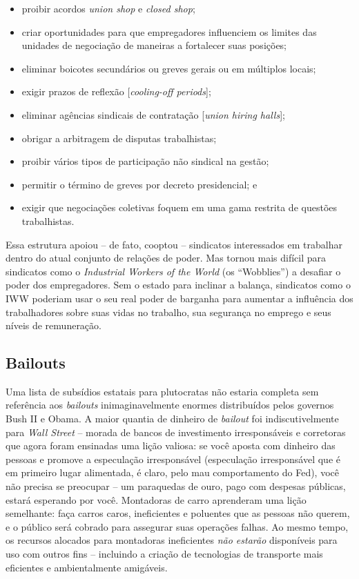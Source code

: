 \begin{itemize}
\item proibir acordos \emph{union shop} e \emph{closed shop};
\item criar oportunidades para que empregadores influenciem os limites das unidades de negociação de maneiras a fortalecer suas posições;
\item eliminar boicotes secundários ou greves gerais ou em múltiplos locais;
\item exigir prazos de reflexão [\emph{cooling-off periods}];
\item eliminar agências sindicais de contratação [\emph{union hiring halls}];
\item obrigar a arbitragem de disputas trabalhistas;
\item proibir vários tipos de participação não sindical na gestão;
\item permitir o término de greves por decreto presidencial; e
\item exigir que negociações coletivas foquem em uma gama restrita de questões trabalhistas.
\end{itemize}

Essa estrutura apoiou -- de fato, cooptou -- sindicatos interessados em trabalhar dentro do atual conjunto de relações de poder. Mas tornou mais difícil para sindicatos como o \emph{Industrial Workers of the World} (os ``Wobblies'') a desafiar o poder dos empregadores. Sem o estado para inclinar a balança, sindicatos como o IWW poderiam usar o seu real poder de barganha para aumentar a influência dos trabalhadores sobre suas vidas no trabalho, sua segurança no emprego e seus níveis de remuneração.

\subsection*{Bailouts}

Uma lista de subsídios estatais para plutocratas não estaria completa sem referência aos \emph{bailouts} inimaginavelmente enormes distribuídos pelos governos Bush II e Obama. A maior quantia de dinheiro de \emph{bailout} foi indiscutivelmente para \emph{Wall Street} -- morada de bancos de investimento irresponsáveis e corretoras que agora foram ensinadas uma lição valiosa: se você aposta com dinheiro das pessoas e promove a especulação irresponsável (especulação irresponsável que é em primeiro lugar alimentada, é claro, pelo mau comportamento do Fed), você não precisa se preocupar -- um paraquedas de ouro, pago com despesas públicas, estará esperando por você. Montadoras de carro aprenderam uma lição semelhante: faça carros caros, ineficientes e poluentes que as pessoas não querem, e o público será cobrado para assegurar suas operações falhas. Ao mesmo tempo, os recursos alocados para montadoras ineficientes \emph{não estarão} disponíveis para uso com outros fins -- incluindo a criação de tecnologias de transporte mais eficientes e ambientalmente amigáveis.

